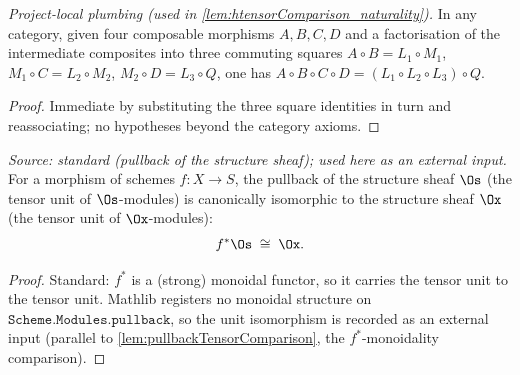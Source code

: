 \begin{lemma}

  \label{lem:compose_three_squares}
  \textit{Project-local plumbing (used in \cref{lem:htensorComparison_naturality}).}
  In any category, given four composable morphisms $A, B, C, D$ and a factorisation of the
  intermediate composites into three commuting squares
  $A \circ B = L_1 \circ M_1$, $M_1 \circ C = L_2 \circ M_2$, $M_2 \circ D = L_3 \circ Q$,
  one has $A \circ B \circ C \circ D = (L_1 \circ L_2 \circ L_3) \circ Q$.
  \begin{proof}
    Immediate by substituting the three square identities in turn and reassociating; no
    hypotheses beyond the category axioms.
  \end{proof}
\end{lemma}

\begin{theorem}
  \label{thm:ega_pullbackUnit}
  \textit{Source: standard (pullback of the structure sheaf); used here as an external input.}
  For a morphism of schemes $f : X \to S$, the pullback of the structure sheaf $\Os$
  (the tensor unit of $\Os$-modules) is canonically isomorphic to the structure sheaf $\Ox$
  (the tensor unit of $\Ox$-modules):
  \[
    f^{*}\Os \;\cong\; \Ox .
  \]
  \begin{proof}
    Standard: $f^{*}$ is a (strong) monoidal functor, so it carries the tensor unit to the
    tensor unit. Mathlib registers no monoidal structure on
    $\mathtt{Scheme.Modules.pullback}$, so the unit isomorphism is recorded as an external
    input (parallel to \cref{lem:pullbackTensorComparison}, the $f^*$-monoidality comparison).
  \end{proof}
\end{theorem}

